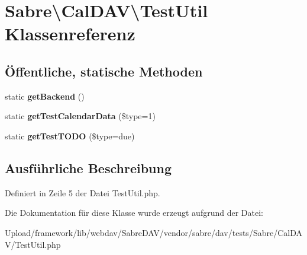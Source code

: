 \hypertarget{class_sabre_1_1_cal_d_a_v_1_1_test_util}{}\section{Sabre\textbackslash{}Cal\+D\+AV\textbackslash{}Test\+Util Klassenreferenz}
\label{class_sabre_1_1_cal_d_a_v_1_1_test_util}
\subsection*{Öffentliche, statische Methoden}
\begin{DoxyCompactItemize}
\item 
\mbox{\label{class_sabre_1_1_cal_d_a_v_1_1_test_util_acda91708513ccd312f32e60a3f16af36}} 
static {\bfseries get\+Backend} ()
\item 
\mbox{\label{class_sabre_1_1_cal_d_a_v_1_1_test_util_a222aacfdb4d982e7a80184001cdd0c48}} 
static {\bfseries get\+Test\+Calendar\+Data} (\$type=1)
\item 
\mbox{\label{class_sabre_1_1_cal_d_a_v_1_1_test_util_a730d7ca2f2c755c7b9da3d98a173ac0e}} 
static {\bfseries get\+Test\+T\+O\+DO} (\$type=\textquotesingle{}due\textquotesingle{})
\end{DoxyCompactItemize}


\subsection{Ausführliche Beschreibung}


Definiert in Zeile 5 der Datei Test\+Util.\+php.



Die Dokumentation für diese Klasse wurde erzeugt aufgrund der Datei\+:\begin{DoxyCompactItemize}
\item 
Upload/framework/lib/webdav/\+Sabre\+D\+A\+V/vendor/sabre/dav/tests/\+Sabre/\+Cal\+D\+A\+V/Test\+Util.\+php\end{DoxyCompactItemize}
